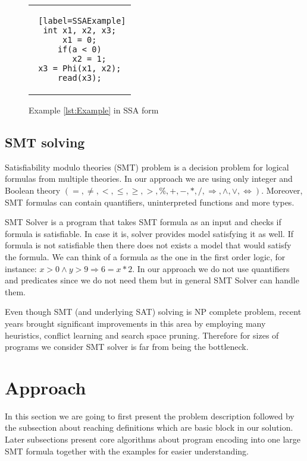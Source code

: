 \documentclass[letterpaper,12pt]{article}
\begin{document}
\begin{figure}[thp] %
\centering 
\caption{Example \ref{lst:Example} in SSA form}
\label{lst:SSAExample}
\begin{tabular}{c}
\begin{lstlisting} [label=SSAExample]
int x1, x2, x3;
x1 = 0;
if(a < 0)
	x2 = 1;
x3 = Phi(x1, x2);
read(x3);
\end{lstlisting}
\end{tabular}
\end{figure}

\subsection{SMT solving}
Satisfiability modulo theories (SMT) problem is a decision problem for logical formulas from multiple theories. In our approach we are using only integer and Boolean theory $(=, \ne, <, \leq, \geq, >, \%, +, -, *, /, \Rightarrow, \land, \lor, \Leftrightarrow).$ Moreover, SMT formulas can contain quantifiers, uninterpreted functions and more types.

SMT Solver is a program that takes SMT formula as an input and checks if formula is satisfiable. In case it is, solver provides model satisfying it as well. If formula is not satisfiable then there does not exists a model that would satisfy the formula. We can think of a formula as the one in the first order logic, for instance: $x > 0 \land y > 9 \Rightarrow 6 = x*2$. In our approach we do not use quantifiers and predicates since we do not need them but in general SMT Solver can handle them.

Even though SMT (and underlying SAT) solving is NP complete problem, recent years brought significant improvements in this area by employing many heuristics, conflict learning and search space pruning. Therefore for sizes of programs we consider SMT solver is far from being the bottleneck. 

\section{Approach}
In this section we are going to first present the problem description followed by the subsection about reaching definitions which are basic block in our solution. Later subsections present core algorithms about program encoding into one large SMT formula together with the examples for easier understanding.
\end{document}
